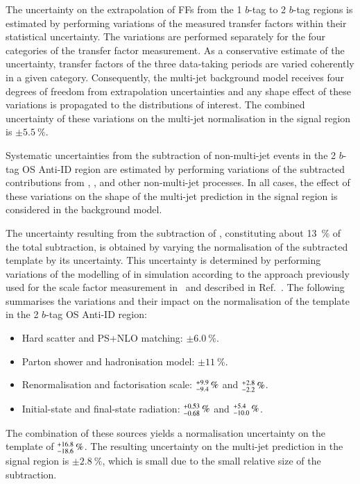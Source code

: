 The uncertainty on the extrapolation of FFs from the 1 $b$-tag to 2 $b$-tag
regions is estimated by performing variations of the measured transfer factors
within their statistical uncertainty. The variations are performed separately
for the four categories of the transfer factor measurement. As a conservative
estimate of the uncertainty, transfer factors of the three data-taking periods
are varied coherently in a given category. Consequently, the multi-jet
background model receives four degrees of freedom from extrapolation
uncertainties and any shape effect of these variations is propagated to the
distributions of interest. The combined uncertainty of these variations on the
multi-jet normalisation in the signal region is $\pm \SI{5.5}{\percent}$.

Systematic uncertainties from the subtraction of non-multi-jet events in the 2
$b$-tag OS Anti-ID region are estimated by performing variations of the
subtracted contributions from \ttbarTrue, \ttbarFakes, and other non-multi-jet
processes. In all cases, the effect of these variations on the shape of the
multi-jet prediction in the signal region is considered in the background model.

The uncertainty resulting from the subtraction of \ttbarTrue, constituting about
\SI{13}{\percent} of the total subtraction, is obtained by varying the
normalisation of the subtracted \ttbarTrue template by its uncertainty. This
uncertainty is determined by performing variations of the modelling of \ttbar in
simulation according to the approach previously used for the \ttbarFakes scale
factor measurement in~ and described in
Ref.~\cite{ATL-PHYS-PUB-2020-023}. The following summarises the variations and
their impact on the normalisation of the \ttbarTrue template in the 2 $b$-tag OS
Anti-ID region:
\begin{itemize}
\item Hard scatter and PS+NLO matching: $\pm\SI{6.0}{\percent}$.
\item Parton shower and hadronisation model: $\pm\SI{11}{\percent}$.
\item Renormalisation and factorisation scale:
  $\numpmerr{+9.9}{-9.4}\valuesep{\si{\percent}}$ and
  $\numpmerr{+2.8}{-2.2}\valuesep{\si{\percent}}$.

\item Initial-state and final-state radiation:
  $\numpmerr{+0.53}{-0.68}\valuesep{\si{\percent}}$ and
  $\numpmerr{+5.4}{-10.0}\valuesep{\si{\percent}}$.
\end{itemize}
The combination of these sources yields a normalisation uncertainty on the
\ttbarTrue template of $\numpmerr{+16.8}{-18.6}\valuesep{\si{\percent}}$. The
resulting uncertainty on the multi-jet prediction in the signal region is
$\pm \SI{2.8}{\percent}$, which is small due to the small relative size of the
\ttbarTrue subtraction.

